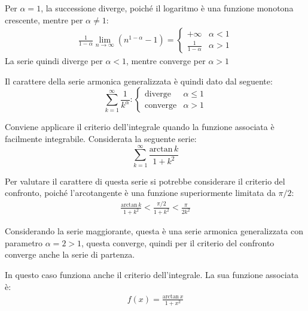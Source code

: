 \documentclass{article}
\numberwithin{equation}{subsection}
\begin{document}
Per $\alpha=1$, la successione diverge, poiché il logaritmo è una funzione monotona crescente, mentre per $\alpha\neq1$:
\begin{gather*}
    \displaystyle\frac{1}{1-\alpha}\lim_{n\to\infty}\left(n^{1-\alpha}-1\right)=\begin{cases}
        +\infty&\alpha<1\\
        \displaystyle\frac{1}{1-\alpha}&\alpha>1
    \end{cases}
\end{gather*}
La serie quindi diverge per $\alpha<1$, mentre converge per $\alpha>1$

Il carattere della serie armonica generalizzata è quindi dato dal seguente:
\begin{equation}
    \displaystyle\sum_{k=1}^\infty\frac{1}{k^\alpha}:\begin{cases}
        \text{diverge}&\alpha\le1\\
        \text{converge}&\alpha>1        
    \end{cases}
\end{equation}


Conviene applicare il criterio dell'integrale quando la funzione associata è facilmente integrabile. Considerata la seguente serie:
\begin{equation*}
    \displaystyle\sum_{k=1}^{\infty}\frac{\text{arctan}\, k}{1+k^2}
\end{equation*}

Per valutare il carattere di questa serie si potrebbe considerare il criterio del confronto, poiché l'arcotangente è una funzione superiormente limitata da $\pi/2$:
\begin{gather*}
    \displaystyle\frac{\text{arctan}\,k}{1+k^2}<\frac{\pi/2}{1+k^2}<\frac{\pi}{2k^2}
\end{gather*}

Considerando la serie maggiorante, questa è una serie armonica generalizzata con parametro $\alpha=2>1$, questa converge, quindi per il criterio del confronto converge anche la serie di partenza. 

In questo caso funziona anche il criterio dell'integrale. La sua funzione associata è:
\begin{gather*}
    f(x)=\displaystyle\frac{\text{arctan}\, x}{1+x^2}
\end{gather*}
\end{document}
